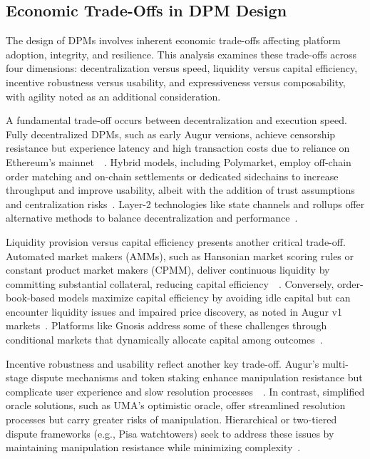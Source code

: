 {\subsection{Economic Trade-Offs in DPM Design}\label{subsec:economic_tradeoff}
The design of DPMs involves inherent economic trade-offs affecting platform adoption, integrity, and resilience. This analysis examines these trade-offs across four dimensions: decentralization versus speed, liquidity versus capital efficiency, incentive robustness versus usability, and expressiveness versus composability, with agility noted as an additional consideration.

A fundamental trade-off occurs between decentralization and execution speed. Fully decentralized DPMs, such as early Augur versions, achieve censorship resistance but experience latency and high transaction costs due to reliance on Ethereum’s mainnet~\cite{BCFKMN14}~\cite{AKPWZ15}. Hybrid models, including Polymarket, employ off-chain order matching and on-chain settlements or dedicated sidechains to increase throughput and improve usability, albeit with the addition of trust assumptions and centralization risks~\cite{ClEsGS21}. Layer-2 technologies like state channels and rollups offer alternative methods to balance decentralization and performance~\cite{BBMMM19}.

Liquidity provision versus capital efficiency presents another critical trade-off. Automated market makers (AMMs), such as Hansonian market scoring rules or constant product market makers (CPMM), deliver continuous liquidity by committing substantial collateral, reducing capital efficiency~\cite{Ha03}~\cite{AC20}. Conversely, order-book-based models maximize capital efficiency by avoiding idle capital but can encounter liquidity issues and impaired price discovery, as noted in Augur v1 markets~\cite{AA20}. Platforms like Gnosis address some of these challenges through conditional markets that dynamically allocate capital among outcomes~\cite{Gn17}.

Incentive robustness and usability reflect another key trade-off. Augur’s multi-stage dispute mechanisms and token staking enhance manipulation resistance but complicate user experience and slow resolution processes~\cite{AKPWZ15}~\cite{ClEsGS21}. In contrast, simplified oracle solutions, such as UMA's optimistic oracle, offer streamlined resolution processes but carry greater risks of manipulation. Hierarchical or two-tiered dispute frameworks (e.g., Pisa watchtowers) seek to address these issues by maintaining manipulation resistance while minimizing complexity~\cite{BBMMM19}.

}
